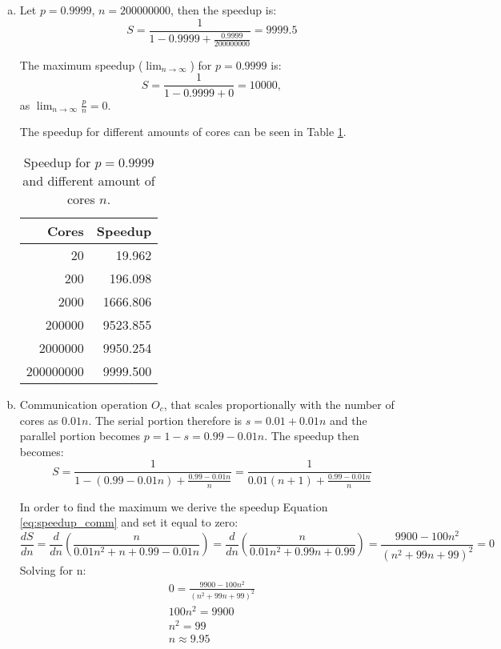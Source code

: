 \documentclass[a4paper,10pt]{article} %
\begin{document}
\begin{enumerate}[a)]
\setcounter{enumi}{0}
\item
Let $p = 0.9999$, $n = 200000000$, then the speedup is: 
\begin{equation}
    S = \frac{1}{1 - 0.9999 + \frac{0.9999}{200000000}} = 9999.5
\end{equation}

The maximum speedup ($\lim_{n \to \infty}$) for $p = 0.9999$ is:
\begin{equation}
    S = \frac{1}{1 - 0.9999 + 0} = 10000,
\end{equation}
as $\lim_{n \to \infty} \frac{p}{n} = 0$.

The speedup for different amounts of cores can be seen in Table \ref{table:1}.

{\begin{table}[h!]
 \centering
{\begin{tabular}{r r}
    \toprule
    Cores & Speedup \\
    \midrule
    20 & 19.962 \\
    200 & 196.098 \\
    2000 & 1666.806 \\
    200000 & 9523.855 \\
    2000000 & 9950.254 \\
    200000000 & 9999.500 \\
    \bottomrule
\end{tabular}}
{\caption{Speedup for $p = 0.9999$ and different amount of cores $n$.}    
\label{table:1}}
\end{table}}

\item
Communication operation $O_c$, that scales proportionally with the number of cores as $0.01n$. The serial portion therefore is $s = 0.01 + 0.01n$ and the parallel portion becomes $p = 1 - s = 0.99 - 0.01n$.
The speedup then becomes:
\begin{equation}
    S = \frac{1}{1 - (0.99 - 0.01n) + \frac{0.99 - 0.01n}{n}} = \frac{1}{0.01(n + 1) + \frac{0.99 - 0.01n}{n}}
\label{eq:speedup_comm}
\end{equation}

In order to find the maximum we derive the speedup Equation \ref{eq:speedup_comm} and set it equal to zero:
\begin{equation}
    \frac{dS}{dn} = \frac{d}{dn}\left(\frac{n}{0.01n^2 + n + 0.99 - 0.01n}\right) = \frac{d}{dn}\left(\frac{n}{0.01n^2 + 0.99n + 0.99}\right) = \frac{9900 - 100n^2}{(n^2 + 99n + 99)^2} = 0
\end{equation}
Solving for n:
\begin{equation}
\begin{split}
    0 = \frac{9900 - 100n^2}{(n^2 + 99n + 99)^2} \\
    100n^2 = 9900 \\
    n^2 = 99 \\
    n \approx 9.95 \\
\end{split}
\end{equation}


\end{enumerate}
\end{document}
